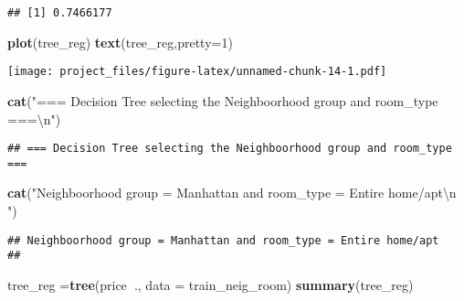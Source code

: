\documentclass[
]{article}
\newenvironment{Shaded}{\begin{snugshade}}{\end{snugshade}}
\newcommand{\CharTok}[1]{\textcolor[rgb]{0.31,0.60,0.02}{#1}}
\newcommand{\DataTypeTok}[1]{\textcolor[rgb]{0.13,0.29,0.53}{#1}}
\newcommand{\DecValTok}[1]{\textcolor[rgb]{0.00,0.00,0.81}{#1}}
\newcommand{\KeywordTok}[1]{\textcolor[rgb]{0.13,0.29,0.53}{\textbf{#1}}}
\newcommand{\NormalTok}[1]{#1}
\newcommand{\OperatorTok}[1]{\textcolor[rgb]{0.81,0.36,0.00}{\textbf{#1}}}
\newcommand{\StringTok}[1]{\textcolor[rgb]{0.31,0.60,0.02}{#1}}
\begin{document}
\begin{Shaded}
\end{Shaded}

\begin{verbatim}
## [1] 0.7466177
\end{verbatim}

\begin{Shaded}
\begin{Highlighting}[]
\KeywordTok{plot}\NormalTok{(tree_reg)}
\KeywordTok{text}\NormalTok{(tree_reg,}\DataTypeTok{pretty=}\DecValTok{1}\NormalTok{)}
\end{Highlighting}
\end{Shaded}

\texttt{[image: project\_files/figure-latex/unnamed-chunk-14-1.pdf]}

\begin{Shaded}
\begin{Highlighting}[]
\KeywordTok{cat}\NormalTok{(}\StringTok{"=== Decision Tree selecting the Neighboorhood group and room_type ===}\CharTok{\textbackslash{}n}\StringTok{"}\NormalTok{)}
\end{Highlighting}
\end{Shaded}

\begin{verbatim}
## === Decision Tree selecting the Neighboorhood group and room_type ===
\end{verbatim}

\begin{Shaded}
\begin{Highlighting}[]
\KeywordTok{cat}\NormalTok{(}\StringTok{"Neighboorhood group = Manhattan and room_type = Entire home/apt}\CharTok{\textbackslash{}n}\StringTok{ "}\NormalTok{)}
\end{Highlighting}
\end{Shaded}

\begin{verbatim}
## Neighboorhood group = Manhattan and room_type = Entire home/apt
## 
\end{verbatim}

\begin{Shaded}
\begin{Highlighting}[]
\NormalTok{tree_reg =}\KeywordTok{tree}\NormalTok{(price}\OperatorTok{~}\NormalTok{., }\DataTypeTok{data =}\NormalTok{ train_neig_room)}
\KeywordTok{summary}\NormalTok{(tree_reg)}
\end{Highlighting}
\end{Shaded}
\end{document}
